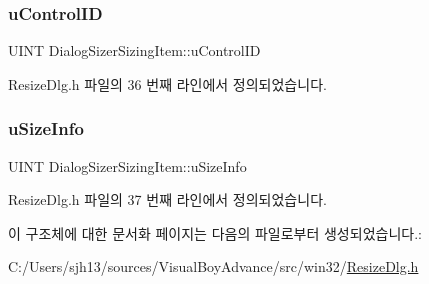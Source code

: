 \subsubsection{\texorpdfstring{u\+Control\+ID}{uControlID}}
{\footnotesize\ttfamily U\+I\+NT Dialog\+Sizer\+Sizing\+Item\+::u\+Control\+ID}



Resize\+Dlg.\+h 파일의 36 번째 라인에서 정의되었습니다.

\mbox{\label{struct_dialog_sizer_sizing_item_af673815342f29c205ec14476c57269c2}} 
\subsubsection{\texorpdfstring{u\+Size\+Info}{uSizeInfo}}
{\footnotesize\ttfamily U\+I\+NT Dialog\+Sizer\+Sizing\+Item\+::u\+Size\+Info}



Resize\+Dlg.\+h 파일의 37 번째 라인에서 정의되었습니다.



이 구조체에 대한 문서화 페이지는 다음의 파일로부터 생성되었습니다.\+:\begin{DoxyCompactItemize}
\item 
C\+:/\+Users/sjh13/sources/\+Visual\+Boy\+Advance/src/win32/\mbox{\hyperlink{_resize_dlg_8h}{Resize\+Dlg.\+h}}\end{DoxyCompactItemize}
